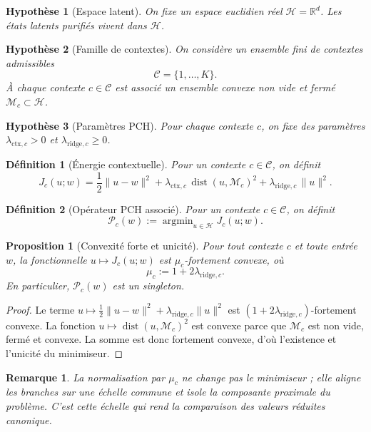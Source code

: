 \documentclass[11pt,a4paper]{article}
\newtheorem{definition}{Définition}[section]
\newtheorem{assumption}{Hypothèse}[section]
\newtheorem{proposition}{Proposition}[section]
\newtheorem{remark}{Remarque}[section]
\DeclareMathOperator{\argmin}{argmin}
\DeclareMathOperator{\dist}{dist}
\newcommand{\R}{\mathbb R}
\newcommand{\Hh}{\mathcal H}
\newcommand{\Mcal}{\mathcal M}
\newcommand{\Ccal}{\mathcal C}
\newcommand{\Pcal}{\mathcal P}
\begin{document}
\begin{assumption}[Espace latent]
On fixe un espace euclidien réel \(\Hh=\R^d\). Les états latents purifiés vivent dans \(\Hh\).
\end{assumption}

\begin{assumption}[Famille de contextes]
On considère un ensemble fini de contextes admissibles
\[
\Ccal=\{1,\dots,K\}.
\]
À chaque contexte \(c\in\Ccal\) est associé un ensemble convexe non vide et fermé \(\Mcal_c\subset\Hh\).
\end{assumption}

\begin{assumption}[Paramètres PCH]
Pour chaque contexte \(c\), on fixe des paramètres \(\lambda_{\mathrm{ctx},c}>0\) et \(\lambda_{\mathrm{ridge},c}\ge 0\).
\end{assumption}

\begin{definition}[Énergie contextuelle]
Pour un contexte \(c\in\Ccal\), on définit
\[
J_c(u;w)=\frac12\|u-w\|^2+\lambda_{\mathrm{ctx},c}\,\dist(u,\Mcal_c)^2+\lambda_{\mathrm{ridge},c}\,\|u\|^2.
\]
\end{definition}

\begin{definition}[Opérateur PCH associé]
Pour un contexte \(c\in\Ccal\), on définit
\[
\Pcal_c(w):=\argmin_{u\in\Hh}J_c(u;w).
\]
\end{definition}

\begin{proposition}[Convexité forte et unicité]
Pour tout contexte \(c\) et toute entrée \(w\), la fonctionnelle \(u\mapsto J_c(u;w)\) est \(\mu_c\)-fortement convexe, où
\[
\mu_c:=1+2\lambda_{\mathrm{ridge},c}.
\]
En particulier, \(\Pcal_c(w)\) est un singleton.
\end{proposition}

\begin{proof}
Le terme \(u\mapsto \frac12\|u-w\|^2+\lambda_{\mathrm{ridge},c}\|u\|^2\) est \((1+2\lambda_{\mathrm{ridge},c})\)-fortement convexe. La fonction \(u\mapsto \dist(u,\Mcal_c)^2\) est convexe parce que \(\Mcal_c\) est non vide, fermé et convexe. La somme est donc fortement convexe, d'où l'existence et l'unicité du minimiseur.
\end{proof}

\begin{remark}
La normalisation par \(\mu_c\) ne change pas le minimiseur ; elle aligne les branches sur une échelle commune et isole la composante proximale du problème. C'est cette échelle qui rend la comparaison des valeurs réduites canonique.
\end{remark}
\end{document}

